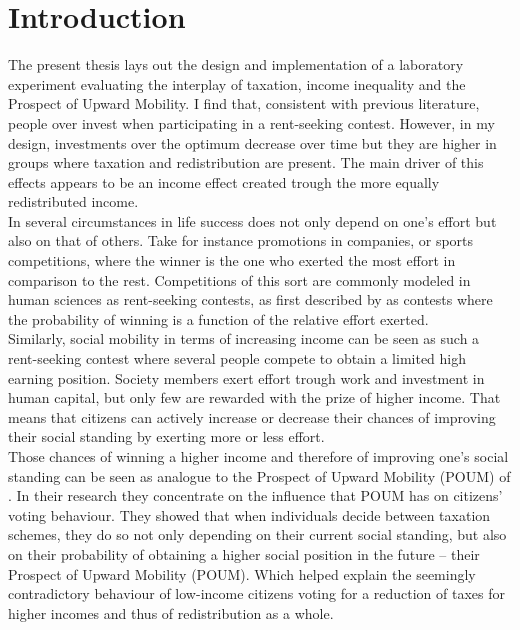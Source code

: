 \chapter{Introduction}
\thispagestyle{fancy}
\label{ch:intro}


The present thesis lays out the design and implementation of a laboratory experiment evaluating the interplay of taxation, income inequality and the Prospect of Upward Mobility. I find that, consistent with previous literature, people over invest when participating in a rent-seeking contest. However, in my design, investments over the optimum decrease over time but they are higher in groups where taxation and redistribution are present. The main driver of this effects appears to be an income effect created trough the more equally redistributed income.\\

In several circumstances in life success does not only depend on one's effort but also on that of others. Take for instance promotions in companies, or sports competitions, where the winner is the one who exerted the most effort in comparison to the rest. Competitions of this sort are commonly modeled in human sciences as rent-seeking contests, as first described by \cite{tullock1980} as contests where the probability of winning is a function of the relative effort exerted.\\

Similarly, social mobility in terms of increasing income can be seen as such a rent-seeking contest where several people compete to obtain a limited high earning position. Society members exert effort trough work and investment in human capital, but only few are rewarded with the prize of higher income. That means that citizens can actively increase or decrease their chances of improving their social standing by exerting more or less effort.\\

Those chances of winning a higher income and therefore of improving one's social standing can be seen as analogue to the Prospect of Upward Mobility (POUM) of \cite{benabou2001}. In their research they concentrate on the influence that POUM has on citizens' voting behaviour. They showed that when individuals decide between taxation schemes, they do so not only depending on their current social standing, but also on their probability of obtaining a higher social position in the future -- their Prospect of Upward Mobility (POUM). Which helped explain the seemingly contradictory behaviour of low-income citizens voting for a reduction of taxes for higher incomes and thus of redistribution as a whole.\\

